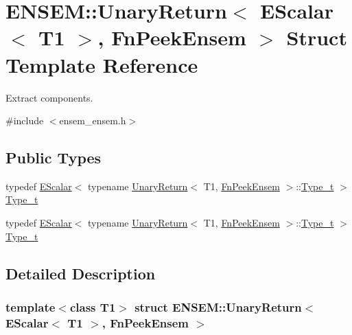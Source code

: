 \hypertarget{structENSEM_1_1UnaryReturn_3_01EScalar_3_01T1_01_4_00_01FnPeekEnsem_01_4}{}\section{E\+N\+S\+EM\+:\+:Unary\+Return$<$ E\+Scalar$<$ T1 $>$, Fn\+Peek\+Ensem $>$ Struct Template Reference}
\label{structENSEM_1_1UnaryReturn_3_01EScalar_3_01T1_01_4_00_01FnPeekEnsem_01_4}


Extract components.  




{\ttfamily \#include $<$ensem\+\_\+ensem.\+h$>$}

\subsection*{Public Types}
\begin{DoxyCompactItemize}
\item 
typedef \mbox{\hyperlink{classENSEM_1_1EScalar}{E\+Scalar}}$<$ typename \mbox{\hyperlink{structENSEM_1_1UnaryReturn}{Unary\+Return}}$<$ T1, \mbox{\hyperlink{structENSEM_1_1FnPeekEnsem}{Fn\+Peek\+Ensem}} $>$\+::\mbox{\hyperlink{structENSEM_1_1UnaryReturn_3_01EScalar_3_01T1_01_4_00_01FnPeekEnsem_01_4_a6043117f7e0aff65d845b3da0fb24d01}{Type\+\_\+t}} $>$ \mbox{\hyperlink{structENSEM_1_1UnaryReturn_3_01EScalar_3_01T1_01_4_00_01FnPeekEnsem_01_4_a6043117f7e0aff65d845b3da0fb24d01}{Type\+\_\+t}}
\item 
typedef \mbox{\hyperlink{classENSEM_1_1EScalar}{E\+Scalar}}$<$ typename \mbox{\hyperlink{structENSEM_1_1UnaryReturn}{Unary\+Return}}$<$ T1, \mbox{\hyperlink{structENSEM_1_1FnPeekEnsem}{Fn\+Peek\+Ensem}} $>$\+::\mbox{\hyperlink{structENSEM_1_1UnaryReturn_3_01EScalar_3_01T1_01_4_00_01FnPeekEnsem_01_4_a6043117f7e0aff65d845b3da0fb24d01}{Type\+\_\+t}} $>$ \mbox{\hyperlink{structENSEM_1_1UnaryReturn_3_01EScalar_3_01T1_01_4_00_01FnPeekEnsem_01_4_a6043117f7e0aff65d845b3da0fb24d01}{Type\+\_\+t}}
\end{DoxyCompactItemize}


\subsection{Detailed Description}
\subsubsection*{template$<$class T1$>$\newline
struct E\+N\+S\+E\+M\+::\+Unary\+Return$<$ E\+Scalar$<$ T1 $>$, Fn\+Peek\+Ensem $>$}

